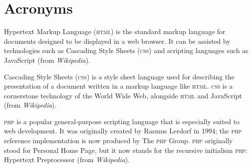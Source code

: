 \begingroup
	\tableofcontents

	\newpage

	\let\clearpage\relax

    \listoffigures

    \vspace{8ex}

    \listoftables

    \vspace{8ex}

    \chapter*{Acronyms}
    \begin{acronym}[HTML]

        {\small Hypertext Markup Language (\textsc{html}) is the standard markup
        language for documents designed to be displayed in a web browser. It can
        be assisted by technologies such as Cascading Style Sheets
        (\textsc{css}) and scripting languages such as JavaScript (from
        \textit{Wikipedia}).}


        {\small Cascading Style Sheets (\textsc{css}) is a style sheet language
        used for describing the presentation of a document written in a markup
        language like \textsc{html}. \textsc{css} is a cornerstone technology of
        the World Wide Web, alongside \textsc{html} and JavaScript (from
        \textit{Wikipedia}).}


        {\small \textsc{php} is a popular general-purpose scripting language
        that is especially suited to web development. It was originally created
        by Rasmus Lerdorf in 1994; the \textsc{php} reference implementation is
        now produced by The \textsc{php} Group. \textsc{php} originally stood
        for Personal Home Page, but it now stands for the recursive initialism
        \textsc{php}: Hypertext Preprocessor (from \textit{Wikipedia}).}
    \end{acronym}
\endgroup

